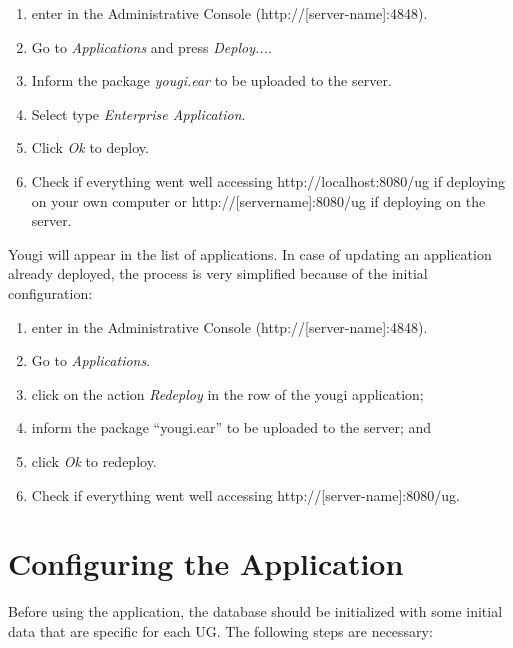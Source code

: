 \documentclass[envcountsame,envcountchap]{svmono}
\begin{document}
\begin{enumerate}
\item enter in the Administrative Console (http://[server-name]:4848).
\item Go to \textit{Applications} and press \textit{Deploy...}.
\item Inform the package \textit{yougi.ear} to be uploaded to the server.
\item Select type \textit{Enterprise Application}.
\item Click \textit{Ok} to deploy.
\item Check if everything went well accessing http://localhost:8080/ug if deploying on your own computer or http://[servername]:8080/ug if deploying on the server.
\end{enumerate}

Yougi will appear in the list of applications. In case of updating an application already deployed, the process is very simplified because of the initial configuration:

\begin{enumerate}
\item enter in the Administrative Console (http://[server-name]:4848).
\item Go to \textit{Applications}.
\item click on the action \textit{Redeploy} in the row of the yougi application;
\item inform the package “yougi.ear” to be uploaded to the server; and
\item click \textit{Ok} to redeploy.
\item Check if everything went well accessing http://[server-name]:8080/ug.
\end{enumerate}

\section{Configuring the Application}

Before using the application, the database should be initialized with some initial data that are specific for each UG. The following steps are necessary:
\end{document}

